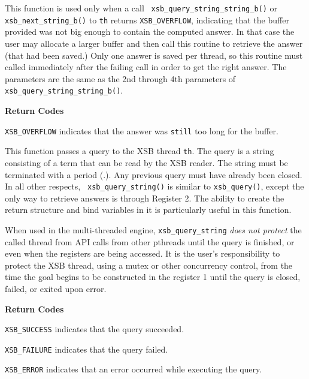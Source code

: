 \begin{description}
%
This function is used only when a call {\tt
  xsb\_query\_string\_string\_b()} or {\tt xsb\_next\_string\_b()} to
{\tt th} returns {\tt XSB\_OVERFLOW}, indicating that the buffer
provided was not big enough to contain the computed answer.  In that
case the user may allocate a larger buffer and then call this routine
to retrieve the answer (that had been saved.)  Only one answer is
saved per thread, so this routine must called immediately after the
failing call in order to get the right answer.  The parameters are the
same as the 2nd through 4th parameters of {\tt
  xsb\_query\_string\_string\_b()}.

{\bf Return Codes}  
\bi
\item {\tt XSB\_OVERFLOW} indicates that the answer was {\tt still}
  too long for the buffer.  
\ei

%
This function passes a query to the XSB thread {\tt th}.  The query is
a string consisting of a term that can be read by the XSB reader.  The
string must be terminated with a period (.).  Any previous query must
have already been closed.  In all other respects, {\tt
  xsb\_query\_string()} is similar to {\tt xsb\_query()}, except the
only way to retrieve answers is through Register 2.  The ability to
create the return structure and bind variables in it is particularly
useful in this function.

When used in the multi-threaded engine, {\tt xsb\_query\_string} {\em
  does not protect} the called thread from API calls from other
pthreads until the query is finished, or even when the registers are
being accessed.  It is the user's responsibility to protect the XSB
thread, using a mutex or other concurrency control, from the time the
goal begins to be constructed in the register 1 until the query is
closed, failed, or exited upon error.

{\bf Return Codes}  
\bi
\item {\tt XSB\_SUCCESS} indicates that the query succeeded.
%
\item {\tt XSB\_FAILURE} indicates that the query failed.
%
\item {\tt XSB\_ERROR} indicates that an error occurred while
  executing the query.  
%
\ei


\end{description}
